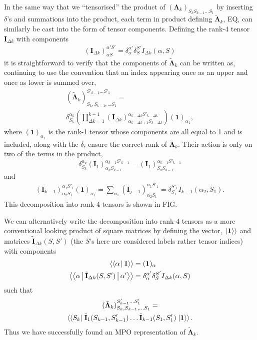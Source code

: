 \documentclass[a4paper, aps, pra,twocolumn]{revtex4-1}
\newcommand{\dket}[1]{\left.\Ket{#1}\right\rangle}
\newcommand{\dbra}[1]{\left\langle\Bra{#1}\right.}
\newcommand{\dbraket}[1]{\left\langle\Braket{#1}\right\rangle}
\begin{document}
In the same way that we ``tensorised'' the product of $(\mathbf{\Lambda}_k)_{S_k S_{k-1} \ldots S_1}$ by inserting $\delta$'s and summations into the product, each term in product defining $\tilde{\mathbf{\Lambda}}_{k}$, EQ, can similarly be cast into the form of tensor components.
Defining the rank-4 tensor $\mathbf{I}_{\Delta k}$ with components
\begin{align}\label{rank4}
(\mathbf{I}_{\Delta k})_{\alpha S}^{\alpha' S'}= \delta_{\alpha}^{\alpha'}\delta_{S}^{S'} I_{\Delta k}(\alpha,S)
\end{align}
it is straightforward to verify that the components of $\tilde{\mathbf{\Lambda}}_{k}$ can be written as, continuing to use the convention that an index appearing once as an upper and once as lower is summed over,
\begin{multline}
(\tilde{\mathbf{\Lambda}}_k)_{ S_k, S_{k-1}, \ldots S_{1}}^{S'_{k-1} \ldots S'_{1}}= \\ \delta_{S_k}^{\alpha_k}\left(\prod_{\Delta k=1}^{k-1} (\mathbf{I}_{\Delta k})_{\alpha_{k-\Delta k+1} S_{k-\Delta k}}^{\alpha_{k-\Delta k} S'_{k-\Delta k} }\right) (\mathbf{1})_{\alpha_1},
\end{multline}
where $(\mathbf{1})_{\alpha_1}$ is the rank-1 tensor whose components are all equal to 1 and is included, along with the $\delta$, ensure the correct rank of $\tilde{\mathbf{\Lambda}}_k$. Their action is only on two of the terms in the product,
\begin{equation}
\delta^{\alpha_k}_{S_k}(\mathbf{I}_{1})_{\alpha_k S_{k-1}}^{\alpha_{k-1} S'_{k-1}}=(\mathbf{I}_{1})_{S_k S_{k-1}}^{\alpha_{k-1} S'_{k-1}}
\end{equation}
and
\begin{align}
(\mathbf{I}_{k-1})_{\alpha_2 S_1}^{\alpha_1 S'_1}(\mathbf{1})_{\alpha_1}=\sum_{\alpha_1}(\mathbf{I}_{j-1})_{\alpha_2 S_1}^{\alpha_1 S'_1}= \delta_{S_1}^{S'_1}I_{k-1}(\alpha_2,S_1).
\end{align}
This decomposition into rank-4 tensors is shown in FIG.

We can alternatively write the decomposition into rank-4 tensors as a more conventional looking product of square matrices by defining the vector, $\dket{\mathbf{1}}$ and matrices $\tilde{\mathbf{I}}_{\Delta k}(S,S')$ (the $S$'s here are considered labels rather tensor indices) with components
\begin{align}
 \dbraket{\alpha|\mathbf{1}}&= (\mathbf{1})_\alpha\\
 \dbraket{\alpha|\tilde{\mathbf{I}}_{\Delta k}(S,S')|\alpha'} &= \delta_{\alpha}^{\alpha'}\delta_{S}^{S'} I_{\Delta k}(\alpha,S)
\end{align}
such that
\begin{multline}
(\tilde{\mathbf{\Lambda}}_k)_{ S_k, S_{k-1}, \ldots S_{1}}^{S'_{k-1} \ldots S'_{1}}= \\
\dbra{S_k}\tilde{\mathbf{I}}_{1}(S_{k-1},S'_{k-1}) \ldots \tilde{\mathbf{I}}_{k-1}(S_1,S'_1)\dket{\mathbf{1}}.
\end{multline}
Thus we have successfully found an MPO representation of $\tilde{\mathbf{\Lambda}}_k$.
\end{document}
